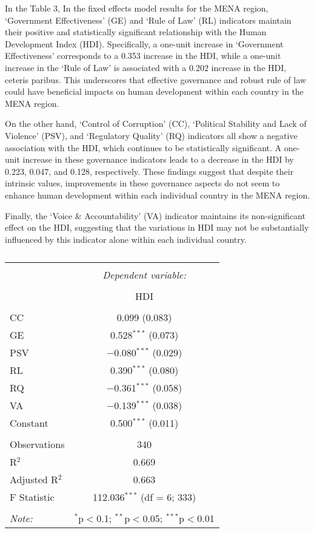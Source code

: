 \documentclass[
  12pt,
]{article}
\begin{document}
In the Table 3, In the fixed effects model results for the MENA region, `Government Effectiveness' (GE) and `Rule of Law' (RL) indicators maintain their positive and statistically significant relationship with the Human Development Index (HDI). Specifically, a one-unit increase in `Government Effectiveness' corresponds to a 0.353 increase in the HDI, while a one-unit increase in the `Rule of Law' is associated with a 0.202 increase in the HDI, ceteris paribus. This underscores that effective governance and robust rule of law could have beneficial impacts on human development within each country in the MENA region.

On the other hand, `Control of Corruption' (CC), `Political Stability and Lack of Violence' (PSV), and `Regulatory Quality' (RQ) indicators all show a negative association with the HDI, which continues to be statistically significant. A one-unit increase in these governance indicators leads to a decrease in the HDI by 0.223, 0.047, and 0.128, respectively. These findings suggest that despite their intrinsic values, improvements in these governance aspects do not seem to enhance human development within each individual country in the MENA region.

Finally, the `Voice \& Accountability' (VA) indicator maintains its non-significant effect on the HDI, suggesting that the variations in HDI may not be substantially influenced by this indicator alone within each individual country.

\begin{table}[!htbp] \centering 
  \caption{} 
  \label{} 
\begin{tabular}{@{\extracolsep{5pt}}lc} 
\\[-1.8ex]\hline 
\hline \\[-1.8ex] 
 & \multicolumn{1}{c}{\textit{Dependent variable:}} \\ 
\cline{2-2} 
\\[-1.8ex] & HDI \\ 
\hline \\[-1.8ex] 
 CC & 0.099 (0.083) \\ 
  GE & 0.528$^{***}$ (0.073) \\ 
  PSV & $-$0.080$^{***}$ (0.029) \\ 
  RL & 0.390$^{***}$ (0.080) \\ 
  RQ & $-$0.361$^{***}$ (0.058) \\ 
  VA & $-$0.139$^{***}$ (0.038) \\ 
  Constant & 0.500$^{***}$ (0.011) \\ 
 \hline \\[-1.8ex] 
Observations & 340 \\ 
R$^{2}$ & 0.669 \\ 
Adjusted R$^{2}$ & 0.663 \\ 
F Statistic & 112.036$^{***}$ (df = 6; 333) \\ 
\hline 
\hline \\[-1.8ex] 
\textit{Note:}  & \multicolumn{1}{r}{$^{*}$p$<$0.1; $^{**}$p$<$0.05; $^{***}$p$<$0.01} \\ 
\end{tabular} 
\end{table}
\end{document}
